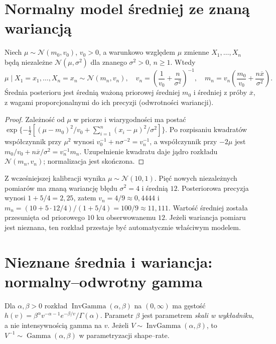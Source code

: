 \section{Normalny model średniej ze znaną wariancją}
\begin{twierdzenie}
\label{thm:normal-normal}
Niech $\mu\sim\mathcal N(m_0,v_0)$, $v_0>0$, a warunkowo
względem $\mu$ zmienne $X_1,\ldots,X_n$ będą niezależne
$\mathcal N(\mu,\sigma^2)$ dla znanego $\sigma^2>0$, $n\ge1$.
Wtedy
\[
 \mu\mid X_1=x_1,\ldots,X_n=x_n\sim\mathcal N(m_n,v_n),
 \quad v_n=\left(\frac1{v_0}+\frac n{\sigma^2}\right)^{-1},
 \quad m_n=v_n\left(\frac{m_0}{v_0}+\frac{n\overline x}{\sigma^2}\right).
\]
Średnia posterioru jest średnią ważoną priorowej średniej
$m_0$ i średniej z próby $\overline x$, z wagami
proporcjonalnymi do ich precyzji (odwrotności wariancji).
\end{twierdzenie}
\begin{proof}
Zależność od $\mu$ w priorze i wiarygodności ma postać
$\exp\{-\tfrac12[(\mu-m_0)^2/v_0+
\sum_{i=1}^n(x_i-\mu)^2/\sigma^2]\}$.
Po rozpisaniu kwadratów współczynnik przy $\mu^2$
wynosi $v_0^{-1}+n\sigma^{-2}=v_n^{-1}$,
a współczynnik przy $-2\mu$ jest
$m_0/v_0+n\overline x/\sigma^2=v_n^{-1}m_n$.
Uzupełnienie kwadratu daje jądro rozkładu
$\mathcal N(m_n,v_n)$; normalizacja jest skończona.
\end{proof}

\begin{przyklad}
Z wcześniejszej kalibracji wynika $\mu\sim\mathcal N(10,1)$.
Pięć nowych niezależnych pomiarów ma znaną wariancję
błędu $\sigma^2=4$ i średnią $12$. Posteriorowa precyzja
wynosi $1+5/4=2{,}25$, zatem
$v_n=4/9\approx0{,}4444$ i
$m_n=(10+5\cdot12/4)/(1+5/4)=100/9\approx11{,}111$.
Wartość średniej została przesunięta od priorowego $10$ ku
obserwowanemu $12$. Jeżeli wariancja pomiaru jest nieznana,
ten rozkład przestaje być automatycznie właściwym modelem.
\end{przyklad}

\section{Nieznane średnia i wariancja: normalny--odwrotny gamma}
\begin{definicja}
Dla $\alpha,\beta>0$ rozkład
$\operatorname{InvGamma}(\alpha,\beta)$ na $(0,\infty)$
ma gęstość
$h(v)=\beta^\alpha v^{-\alpha-1}e^{-\beta/v}/\Gamma(\alpha)$.
Parametr $\beta$ jest parametrem \emph{skali w wykładniku},
a nie intensywnością gamma na $v$. Jeżeli
$V\sim\operatorname{InvGamma}(\alpha,\beta)$,
to $V^{-1}\sim\operatorname{Gamma}(\alpha,\beta)$
w parametryzacji shape--rate.
\end{definicja}

